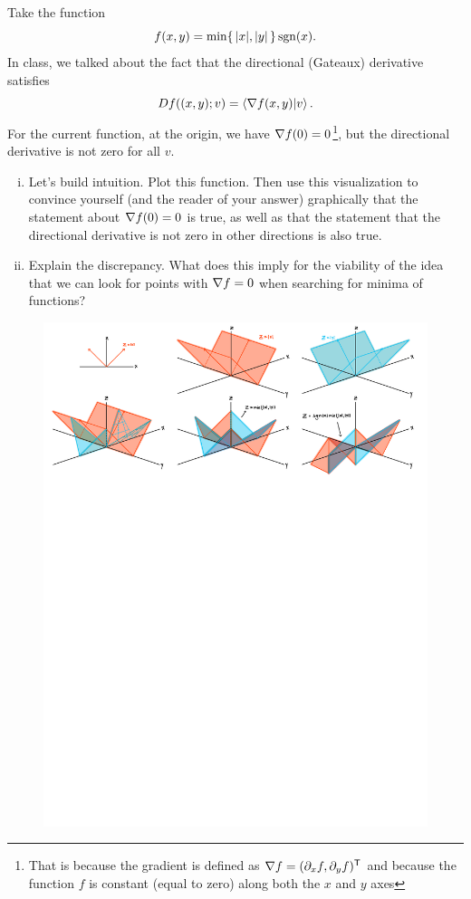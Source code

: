 \documentclass[12pt]{memoir}
\begin{document}
\begin{Ej}
    
    Take the function 
    $$f(x,y)=\min\{\,|x|,|y|\,\}\operatorname{sgn}(x).$$
    In class, we talked about the fact that the directional (Gateaux) derivative satisfies
    $$Df((x,y);v)=\braket{\nabla f(x,y)}{v}.$$
    For the current function, at the origin, we have $\nabla f(0)=0$\footnote{That is because the gradient is defined as $\nabla f=(\partial_x f,\partial_y f)^{\mathsf{T}}$ and because the function $f$ is constant (equal to zero) along both the $x$ and $y$ axes}, but the directional derivative is not zero for all $v$.
    \begin{enumerate}[i)]
        \item Let's build intuition. Plot this function. Then use this visualization to convince yourself (and the
        reader of your answer) graphically that the statement about $\nabla f(0)=0$ is true, as well as that the
        statement that the directional derivative is not zero in other directions is also true.
        \item Explain the discrepancy. What does this imply for the viability of the idea that we can look for points
        with $\nabla f=0$ when searching for minima of functions?
    \end{enumerate}
   
\end{Ej}

\begin{figure}[h!]
    \centering
    \includegraphics[width=1\textwidth, trim= 0.3cm 19.5cm 0.6cm 0.1cm,clip]{fig1.pdf}
\end{figure}
\end{document}
